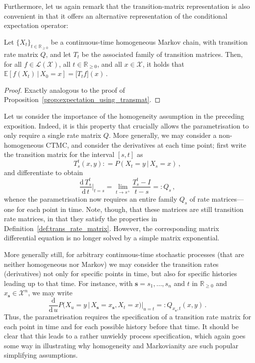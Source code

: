 \documentclass[graybox]{svmult}
\newcommand{\reals}{\mathbb{R}}
\newcommand{\realsnonneg}{\reals_{\geq 0}}
\newcommand{\states}{\mathcal{X}}
\newcommand{\gambles}{\mathcal{L}}
\newcommand{\gamblesX}{\gambles(\states)}
\newcommand{\coloneqq}{:\!=}
\begin{document}
Furthermore, let us again remark that the transition-matrix representation is also convenient in that it offers an alternative representation of the conditional expectation operator:
\begin{proposition}\label{prop:expectation_using_transmat_also_ctmc}
Let $\{X_t\}_{t\in\realsnonneg}$ be a continuous-time homogeneous Markov chain, with transition rate matrix $Q$, and let $T_t$ be the associated family of transition matrices. Then, for all $f\in\gamblesX$, all $t\in\realsnonneg$, and all $x\in\states$, it holds that $\mathbb{E}[f(X_t)\,\vert\,X_0=x]=\bigl[T_tf\bigr](x)$\,.
\end{proposition}
\begin{proof}
Exactly analogous to the proof of Proposition~\ref{prop:expectation_using_transmat}.
\end{proof}

Let us consider the importance of the homogeneity assumption in the preceding exposition. Indeed, it is this property that crucially allows the parametrisation to only require a single rate matrix $Q$. More generally, we may consider a non-homogeneous CTMC, and consider the derivatives at each time point; first write the transition matrix for the interval $[s,t]$ as
\begin{equation*}
T_s^t(x,y) \coloneqq P(X_t=y\,\vert\,X_s=x)\,,
\end{equation*}
and differentiate to obtain
\begin{equation*}
\frac{\mathrm{d}\,T_s^t}{\mathrm{d}\,t}\bigg\vert_{t=s} = \lim_{t\to s^+}\frac{T_s^t-I}{t-s} =: Q_s\,,
\end{equation*}
whence the parametrisation now requires an entire family $Q_s$ of rate matrices---one for each point in time. Note, though, that these matrices are still transition rate matrices, in that they satisfy the properties in Definition~\ref{def:trans_rate_matrix}. However, the corresponding matrix differential equation is no longer solved by a simple matrix exponential. 

More generally still, for arbitrary continuous-time stochastic processes (that are neither homogeneous nor Markov) we may consider the transition rates (derivatives) not only for specific points in time, but also for specific histories leading up to that time. For instance, with $\mathbf{s}=s_1,\ldots,s_n$ and $t$ in $\realsnonneg$ and $x_\mathbf{s}\in\states^n$, we may write
\begin{equation}\label{eq:general_cont_time_deriv} \frac{\mathrm{d}}{\mathrm{d}\,u}P\bigl(X_u=y\,\vert\,X_\mathbf{s}=x_\mathbf{s},X_t=x\bigr)\bigg\vert_{u=t} =: Q_{x_\mathbf{s},t}(x,y)\,.
\end{equation}
Thus, the parametrisation requires the specification of a transition rate matrix for each point in time and for each possible history before that time. It should be clear that this leads to a rather unwieldy process specification, which again goes some way in illustrating why homogeneity and Markovianity are such popular simplifying assumptions.
\end{document}
